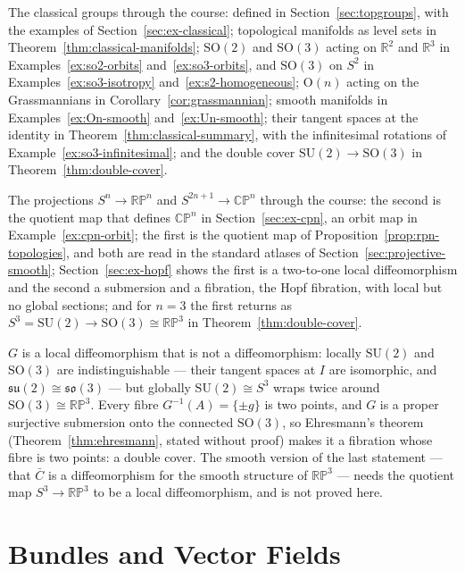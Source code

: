 \documentclass[11pt]{report}
\newcommand{\Ogp}{\mathrm{O}}
\newcommand{\SO}{\mathrm{SO}}
\begin{document}
The classical groups through the course: defined in Section~\ref{sec:topgroups}, with the examples of Section~\ref{sec:ex-classical}; topological manifolds as level sets in Theorem~\ref{thm:classical-manifolds}; $\SO(2)$ and $\SO(3)$ acting on $\mathbb{R}^2$ and $\mathbb{R}^3$ in Examples~\ref{ex:so2-orbits} and~\ref{ex:so3-orbits}, and $\SO(3)$ on $S^2$ in Examples~\ref{ex:so3-isotropy} and~\ref{ex:s2-homogeneous}; $\Ogp(n)$ acting on the Grassmannians in Corollary~\ref{cor:grassmannian}; smooth manifolds in Examples~\ref{ex:On-smooth} and~\ref{ex:Un-smooth}; their tangent spaces at the identity in Theorem~\ref{thm:classical-summary}, with the infinitesimal rotations of Example~\ref{ex:so3-infinitesimal}; and the double cover $\mathrm{SU}(2) \to \SO(3)$ in Theorem~\ref{thm:double-cover}.

The projections $S^n \to \mathbb{RP}^n$ and $S^{2n+1} \to \mathbb{CP}^n$ through the course: the second is the quotient map that defines $\mathbb{CP}^n$ in Section~\ref{sec:ex-cpn}, an orbit map in Example~\ref{ex:cpn-orbit}; the first is the quotient map of Proposition~\ref{prop:rpn-topologies}, and both are read in the standard atlases of Section~\ref{sec:projective-smooth}; Section~\ref{sec:ex-hopf} shows the first is a two-to-one local diffeomorphism and the second a submersion and a fibration, the Hopf fibration, with local but no global sections; and for $n = 3$ the first returns as $S^3 = \mathrm{SU}(2) \to \SO(3) \cong \mathbb{RP}^3$ in Theorem~\ref{thm:double-cover}.


\begin{rembox}\label{rem:what-example-shows-2}
$G$ is a local diffeomorphism that is not a diffeomorphism: locally $\mathrm{SU}(2)$ and $\SO(3)$ are indistinguishable --- their tangent spaces at $I$ are isomorphic, and $\mathfrak{su}(2) \cong \mathfrak{so}(3)$ --- but globally $\mathrm{SU}(2) \cong S^3$ wraps twice around $\SO(3) \cong \mathbb{RP}^3$. Every fibre $G^{-1}(A) = \{\pm g\}$ is two points, and $G$ is a proper surjective submersion onto the connected $\SO(3)$, so Ehresmann's theorem (Theorem~\ref{thm:ehresmann}, stated without proof) makes it a fibration whose fibre is two points: a double cover. The smooth version of the last statement --- that $\bar C$ is a diffeomorphism for the smooth structure of $\mathbb{RP}^3$ --- needs the quotient map $S^3 \to \mathbb{RP}^3$ to be a local diffeomorphism, and is not proved here.
\end{rembox}

\chapter{Bundles and Vector Fields}
\end{document}
